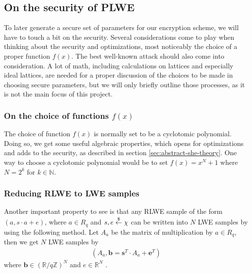 \documentclass[../main.tex]{subfiles}
\begin{document}
\subsection{On the security of PLWE}
    To later generate a secure set of parameters for our encryption scheme, we will have to touch a bit on the security.
    Several considerations come to play when thinking about the security and optimizations, most noticeably the choice
    of a proper function $f(x)$. The best well-known attack should also come into consideration.
    A lot of math, including calculations on lattices and especially ideal lattices, are needed for a proper discussion of the
    choices to be made in choosing secure parameters, but we will only briefly outline those processes, as it is not the main focus of this project.

\subsubsection{On the choice of functions $f(x)$}
    The choice of function $f(x)$ is normally set to be a cyclotomic polynomial. Doing so, we get some useful algebraic properties, which opens for optimizations and adds to the security, as described in section \ref{sec:abstract-she-theory}.
    One way to choose a cyclotomic polynomial would be to set $f(x) = x^N + 1$ where $N = 2^k$ for $k \in \mathbb{N}$.

    \subsubsection{Reducing RLWE to LWE samples}
        Another important property to see is that any RLWE sample of the form $(a, s \cdot a + e)$,
		where $a \in R_q$ and $s, e \overset{\$}{\gets}{} \chi$ can be written into $N$ LWE samples by using the following method.
        Let $A_a$ be the matrix of multiplication by $a \in R_q$, then we get $N$ LWE samples by
        \begin{align*}
            (A_a, \textbf{b} = \textbf{s}^T \cdot A_a + \textbf{e}^T)
        \end{align*}
        where $\textbf{b} \in (\mathbb{R} / q\mathbb{Z})^N$ and $e \in \mathbb{R}^N$ \cite{peikert2016not}.
\end{document}
